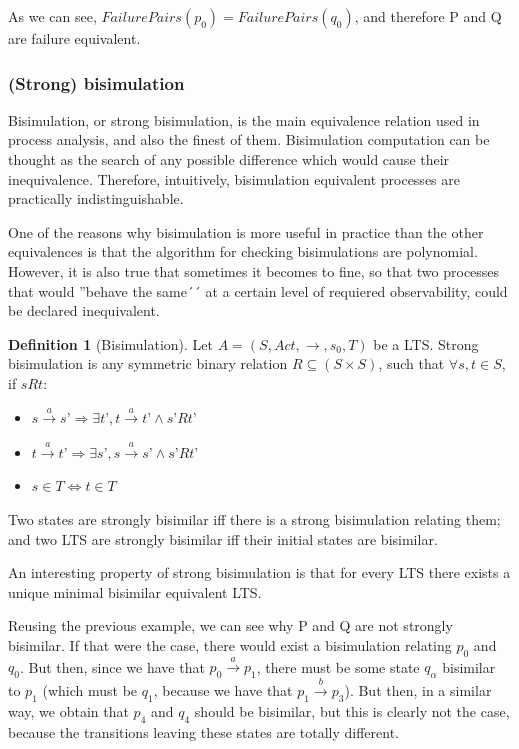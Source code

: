 \documentclass[11pt]{article}
\theoremstyle{definition}
\newtheorem{definition}{Definition}
\theoremstyle{plain}
\theoremstyle{definition}
\begin{document}
As we can see, $ FailurePairs(p_0) = FailurePairs(q_0) $, and therefore P and Q are failure equivalent.

\subsubsection{(Strong) bisimulation}

Bisimulation, or strong bisimulation, is the main equivalence relation used in process analysis, and also the finest of them. Bisimulation computation can be thought as the search of any possible difference which would cause their inequivalence. Therefore, intuitively, bisimulation equivalent processes are practically indistinguishable.

One of the reasons why bisimulation is more useful in practice than the other equivalences is that the algorithm for checking bisimulations are polynomial. However, it is also true that sometimes it becomes to fine, so that two processes that would ''behave the same´´ at a certain level of requiered observability, could be declared inequivalent.

\begin{definition} [Bisimulation]
	Let $ A = (S, Act, \rightarrow, s_0, T) $ be a LTS. Strong bisimulation is any symmetric binary relation $ R  \subseteq (S\times S) $, such that $ \forall s, t \in S$, if $s R t $:
	\begin{itemize}
		\item $ s\xrightarrow{a}s’ \Rightarrow \exists t’, t\xrightarrow{a}t’ \wedge s’ R t’ $
		\item $ t\xrightarrow{a}t’ \Rightarrow \exists s’, s\xrightarrow{a}s’ \wedge s’ R t’ $
		\item $ s \in T \iff t \in T $
	\end{itemize}
	
\end{definition}

Two states are strongly bisimilar iff there is a strong bisimulation relating them; and two LTS are strongly bisimilar iff their initial states are bisimilar.

An interesting property of strong bisimulation is that for every LTS there exists a unique minimal bisimilar equivalent LTS.

Reusing the previous example, we can see why P and Q are not strongly bisimilar. If that were the case, there would exist a bisimulation relating $ p_0 $ and $ q_0 $. But then, since we have that $ p_0 \xrightarrow{a}p_1 $, there must be some state $ q_\alpha $ bisimilar to $ p_1 $ (which must be $ q_1 $, because we have that $ p_1 \xrightarrow{b}p_3 $). But then, in a similar way, we obtain that $ p_4 $ and $ q_4 $ should be bisimilar, but this is clearly not the case, because the transitions leaving these states are totally different.
\end{document}
